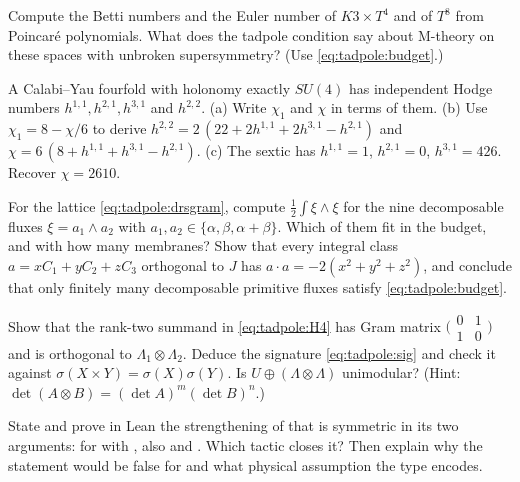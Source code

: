 \begin{exercise}[$\star$]
Compute the Betti numbers and the Euler number of $K3\times T^4$ and of $T^8$ from Poincar\'e
polynomials. What does the tadpole condition say about M-theory on these spaces with
unbroken supersymmetry? (Use \eqref{eq:tadpole:budget}.)
\end{exercise}

\begin{exercise}[$\star\star$]\label{exe:tadpole:hodge}
A Calabi--Yau fourfold with holonomy exactly $SU(4)$ has independent Hodge numbers
$h^{1,1},h^{2,1},h^{3,1}$ and $h^{2,2}$. (a) Write $\chi_1$ and $\chi$ in terms of them.
(b) Use $\chi_1=8-\chi/6$ to derive $h^{2,2}=2\,(22+2h^{1,1}+2h^{3,1}-h^{2,1})$ and
$\chi=6\,(8+h^{1,1}+h^{3,1}-h^{2,1})$. (c) The sextic has $h^{1,1}=1$, $h^{2,1}=0$,
$h^{3,1}=426$. Recover $\chi=2610$.
\end{exercise}

\begin{exercise}[$\star\star$]
For the lattice \eqref{eq:tadpole:drsgram}, compute $\tfrac12\int\xi\wedge\xi$ for the nine
decomposable fluxes $\xi=a_1\wedge a_2$ with $a_1,a_2\in\{\alpha,\beta,\alpha+\beta\}$. Which
of them fit in the budget, and with how many membranes? Show that every integral class
$a=xC_1+yC_2+zC_3$ orthogonal to $J$ has $a\cdot a=-2(x^2+y^2+z^2)$, and conclude that only
finitely many decomposable primitive fluxes satisfy \eqref{eq:tadpole:budget}.
\end{exercise}

\begin{exercise}[$\star\star$]
Show that the rank-two summand in \eqref{eq:tadpole:H4} has Gram matrix
$\bigl(\begin{smallmatrix}0&1\\1&0\end{smallmatrix}\bigr)$ and is orthogonal to
$\Lambda_1\otimes\Lambda_2$. Deduce the signature \eqref{eq:tadpole:sig} and check it against
$\sigma(X\times Y)=\sigma(X)\sigma(Y)$. Is $U\oplus(\Lambda\otimes\Lambda)$ unimodular?
(Hint: $\det(A\otimes B)=(\det A)^{m}(\det B)^{n}$.)
\end{exercise}

\begin{exercise}
State and prove in Lean the strengthening of  that is symmetric in its
two arguments: for  with , also  and
. Which tactic closes it? Then explain why the statement would be
false for  and what physical assumption the type  encodes.
\end{exercise}

